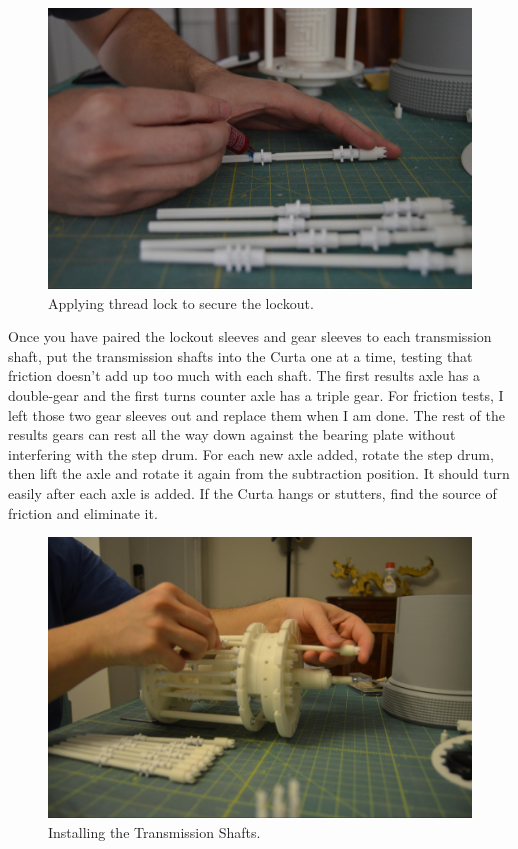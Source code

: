 \documentclass[openany]{book}
\begin{document}
\begin{figure}[!ht]
	\centering
	\includegraphics[width=.75\textwidth]{images/image24.jpg}
	\caption{Applying thread lock to secure the lockout.}
	\label{fig:image24}	
\end{figure}



Once you have paired the lockout sleeves and gear sleeves to each transmission shaft, put the transmission shafts into the Curta one at a time, testing that friction doesn't add up too much with each shaft. The first results axle has a double-gear and the first turns counter axle has a triple gear. For friction tests, I left those two gear sleeves out and replace them when I am done. The rest of the results gears can rest all the way down against the bearing plate without interfering with the step drum. For each new axle added, rotate the step drum, then lift the axle and rotate it again from the subtraction position. It should turn easily after each axle is added. If the Curta hangs or stutters, find the source of friction and eliminate it.

\begin{figure}[!ht]
	\centering
	\includegraphics[width=.75\textwidth]{images/image50.jpg}
	\caption{Installing the Transmission Shafts.}
	\label{fig:image50}	
\end{figure}
\end{document}
